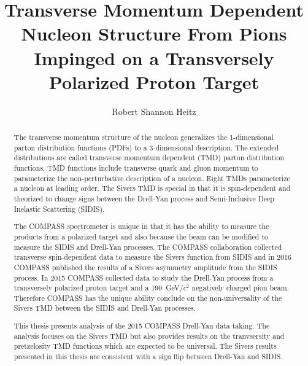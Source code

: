 \documentclass[edeposit,fullpage]{Classes/uiucthesis2009}
\newcommand{\gvcw}{GeV/$c^2$} \newcommand{\mvcw}{MeV/$c^2$}
\begin{document}
\title{Transverse Momentum Dependent Nucleon Structure From Pions Impinged on a
  Transversely Polarized Proton Target}

\author{Robert Shannon Heitz}
\phdthesis
{}
  
\maketitle

\frontmatter

\begin{abstract}
The transverse momentum structure of the nucleon generalizes the 1-dimensional
parton distribution functions (PDFs) to a 3-dimensional description.  The
extended distributions are called transverse momentum dependent (TMD) parton
distribution functions.  TMD functions include transverse quark and gluon
momentum to parameterize the non-perturbative description of a nucleon.  Eight
TMDs parameterize a nucleon at leading order.  The Sivers TMD is special in
that it is spin-dependent and theorized to change signs between the Drell-Yan
process and Semi-Inclusive Deep Inelastic Scattering (SIDIS).

The COMPASS spectrometer is unique in that it has the ability to measure the
products from a polarized target and also because the beam can be modified to
measure the SIDIS and Drell-Yan processes.  The COMPASS collaboration collected
transverse spin-dependent data to measure the Sivers function from SIDIS and in
2016 COMPASS published the results of a Sivers asymmetry amplitude from the
SIDIS process.  In 2015 COMPASS collected data to study the Drell-Yan process
from a transversely polarized proton target and a 190~{\gvcw} negatively charged
pion beam.  Therefore COMPASS has the unique ability conclude on the
non-universality of the Sivers TMD between the SIDIS and Drell-Yan processes.

This thesis presents analysis of the 2015 COMPASS Drell-Yan data taking.  The
analysis focuses on the Sivers TMD but also provides results on the tranvsersity
and pretzelosity TMD functions which are expected to be universal.  The Sivers
results presented in this thesis are consistent with a sign flip between
Drell-Yan and SIDIS.
\end{abstract}
\end{document}
